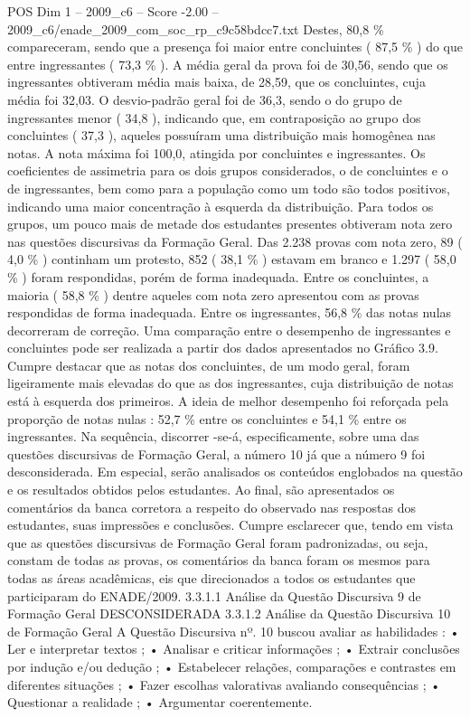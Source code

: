 \begin{textsample}{POS Dim 1 – 2009\_c6 – Score -2.00 – 2009\_c6/enade\_2009\_com\_soc\_rp\_c9c58bdcc7.txt}
Destes, 80,8 \% compareceram, sendo que a presença foi maior entre concluintes ( 87,5 \% ) do que entre ingressantes ( 73,3 \% ).
A média geral da prova foi de 30,56, sendo que os ingressantes obtiveram média mais baixa, de 28,59, que os concluintes, cuja média foi 32,03.
O desvio-padrão geral foi de 36,3, sendo o do grupo de ingressantes menor ( 34,8 ), indicando que, em contraposição ao grupo dos concluintes ( 37,3 ), aqueles possuíram uma distribuição mais homogênea nas notas.
A nota máxima foi 100,0, atingida por concluintes e ingressantes.
Os coeficientes de assimetria para os dois grupos considerados, o de concluintes e o de ingressantes, bem como para a população como um todo são todos positivos, indicando uma maior concentração à esquerda da distribuição.
Para todos os grupos, um pouco mais de metade dos estudantes presentes obtiveram nota zero nas questões discursivas da Formação Geral.
Das 2.238 provas com nota zero, 89 ( 4,0 \% ) continham um protesto, 852 ( 38,1 \% ) estavam em branco e 1.297 ( 58,0 \% ) foram respondidas, porém de forma inadequada.
Entre os concluintes, a maioria ( 58,8 \% ) dentre aqueles com nota zero apresentou com as provas respondidas de forma inadequada.
Entre os ingressantes, 56,8 \% das notas nulas decorreram de correção.
Uma comparação entre o desempenho de ingressantes e concluintes pode ser realizada a partir dos dados apresentados no Gráfico 3.9.
Cumpre destacar que as notas dos concluintes, de um modo geral, foram ligeiramente mais elevadas do que as dos ingressantes, cuja distribuição de notas está à esquerda dos primeiros.
A ideia de melhor desempenho foi reforçada pela proporção de notas nulas : 52,7 \% entre os concluintes e 54,1 \% entre os ingressantes.
Na sequência, discorrer -se-á, especificamente, sobre uma das questões discursivas de Formação Geral, a número 10 já que a número 9 foi desconsiderada.
Em especial, serão analisados os conteúdos englobados na questão e os resultados obtidos pelos estudantes.
Ao final, são apresentados os comentários da banca corretora a respeito do observado nas respostas dos estudantes, suas impressões e conclusões.
Cumpre esclarecer que, tendo em vista que as questões discursivas de Formação Geral foram padronizadas, ou seja, constam de todas as provas, os comentários da banca foram os mesmos para todas as áreas acadêmicas, eis que direcionados a todos os estudantes que participaram do ENADE/2009. 3.3.1.1 Análise da Questão Discursiva 9 de Formação Geral DESCONSIDERADA 3.3.1.2 Análise da Questão Discursiva 10 de Formação Geral A Questão Discursiva nº. 10 buscou avaliar as habilidades : • Ler e interpretar textos ; • Analisar e criticar informações ; • Extrair conclusões por indução e/ou dedução ; • Estabelecer relações, comparações e contrastes em diferentes situações ; • Fazer escolhas valorativas avaliando consequências ; • Questionar a realidade ; • Argumentar coerentemente.

\end{textsample}
